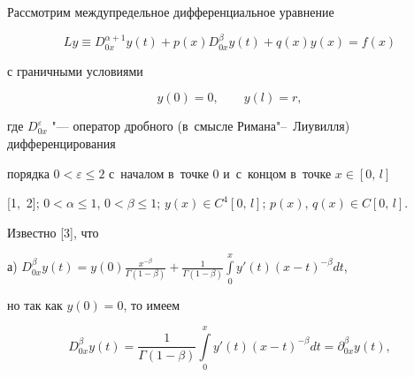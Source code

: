 







\maketitle





Рассмотрим междупредельное дифференциальное уравнение

\begin{equation}

\label{ch1}

Ly\equiv D^{\alpha+1}_{0x} y(t)+p(x) D^\beta_{0x}y(t)+q(x) y(x)=f(x)

\end{equation}

с граничными условиями

\begin{equation}

\label{ch2} y(0)=0, \qquad y(l)=r,

\end{equation} 

где $D^\varepsilon_{0x}$ "--- оператор дробного (в~смысле Римана"--~Лиувилля) дифференцирования 

порядка $0<\varepsilon\le 2$ с~началом в~точке 0 и~с~концом в~точке $x\in [0,\,l]$ 

[1,~2]; $0<\alpha\le 1$, $0<\beta\le 1$; $y(x)\in C^4 [0,\,l]$; $p(x)$, $q(x)\in C[0,\,l]$. 



Известно [3], что



а) $\displaystyle 

D^\beta_{0x}y(t)=y(0)\frac{x^{-\beta}}{\Gamma(1-\beta)}+ 

\frac{1}{\Gamma(1-\beta)}\int\limits_0^x 

y'(t)(x-t)^{-\beta}dt$,  

 

\noindent 

но так как $y(0)=0$, то имеем 

\begin{equation} 

\label{ch3} 

D^\beta_{0x}y(t)=\frac{1}{\Gamma(1-\beta)}\int\limits_0^x 

y'(t)(x-t)^{-\beta}dt=\partial^\beta_{0x} y(t), 

\end{equation} 

